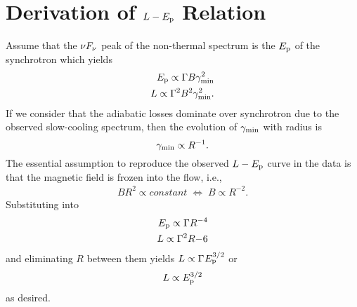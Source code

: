 \chapter{Derivation of $L-E_{\rm p}$ Relation}
\label{ch:lep}

Assume that the $\nu F_{\nu}$ peak of the non-thermal spectrum is the $E_{\rm p}$ of the synchrotron which yields
\begin{eqnarray}
  \label{eq:ep1}
  E_{\rm p} \propto \Gamma B \gamma_{\rm min}^2\\
L\propto \Gamma^2 B^2 \gamma_{\rm min}^2.
\end{eqnarray}
If we consider that the adiabatic losses dominate over synchrotron due to the observed slow-cooling spectrum, then the evolution of $\gamma_{\rm min}$ with radius is
\begin{equation}
  \label{eq:gr}
  \gamma_{\rm min} \propto R^{-1}.
\end{equation}
The essential assumption to reproduce the observed $L-E_{\rm p}$ curve in the data is that the magnetic field is frozen into the flow, i.e.,
\begin{eqnarray}
  \label{eq:fluxfrz}
  BR^2\propto constant\;\Leftrightarrow\;B\propto R^{-2}.
\end{eqnarray}
Substituting  into 
\begin{eqnarray}
  \label{eq:ep1}
  E_{\rm p} \propto \Gamma R^{-4}\\
L\propto \Gamma^2 R{-6}
\end{eqnarray}
and eliminating $R$ between them yields $L \propto \Gamma^{}
E_{\rm p}^{3/2}$ or
\begin{equation}
  \label{eq:Lep}
  L \propto E_{\rm p}^{3/2}
\end{equation}
as desired.


